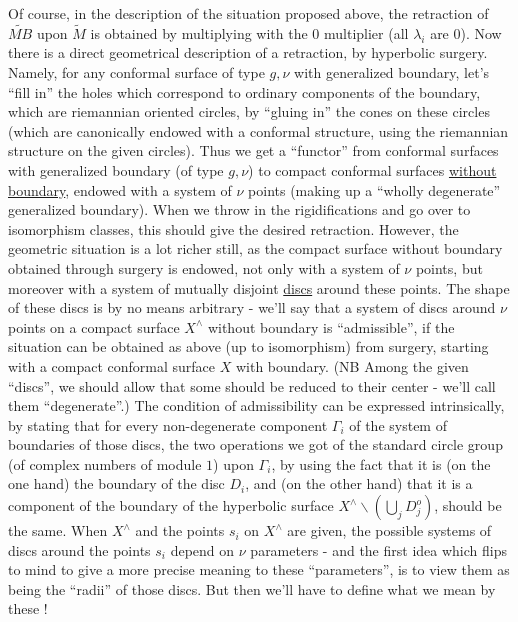 Of course, in the description of the situation proposed above, the retraction of $\widetilde{MB}$ upon $\widetilde M$ is obtained by multiplying with the $0$ multiplier (all $\lambda_i$ are $0$). Now there is a direct geometrical description of  a retraction, by hyperbolic surgery. Namely, for any  conformal surface of type $g,\nu$ with generalized boundary, let's ``fill in'' the holes which correspond to ordinary components of the boundary, which are riemannian oriented circles, by ``gluing in'' the cones on these circles (which are canonically endowed with a conformal structure, using the riemannian structure on the given circles). Thus we get a ``functor'' from  conformal surfaces with generalized boundary (of type $g,\nu$) to compact conformal surfaces \uline{without boundary}, endowed with a system of $\nu$ points (making up a
``wholly degenerate'' generalized boundary). When we throw in the rigidifications and go over to isomorphism classes, this should give the desired retraction. However, the geometric situation is a lot richer still, as the compact surface without boundary obtained through surgery is endowed, not only with a system of $\nu$ points, but moreover with a system of mutually disjoint \uline{discs} around these points. The shape of these discs is by no means arbitrary - we'll say that a system of discs around $\nu$ points on a compact  surface $X^{\wedge}$ without boundary is ``admissible'', if the situation can be obtained as above (up to isomorphism) from surgery, starting with a compact conformal surface $X$ with boundary. (NB Among the given ``discs'', we should allow that some should be reduced to their center - we'll call them ``degenerate''.) The condition of admissibility can be expressed intrinsically, by stating that  for every non-degenerate component $\Gamma_i$ of the system of boundaries of those discs, the two operations we got of the standard circle group (of complex numbers of module $1$) upon $\Gamma_i$, by using the fact that it is (on the one hand) the boundary of the disc $D_i$, and (on the other hand) that it is a component of the boundary of the hyperbolic surface $X^{\wedge}\backslash(\bigcup_j D_j^{o})$, should be the same. When $X^{\wedge}$ and the points $s_i$ on $X^{\wedge}$ are given, the possible  systems of discs around the points $s_i$ depend on $\nu$ parameters - and the first idea which flips to mind to give a more precise meaning to these ``parameters'', is to view them as being the ``radii'' of those discs. But then we'll have to define what we mean by these !
\margin{!}

